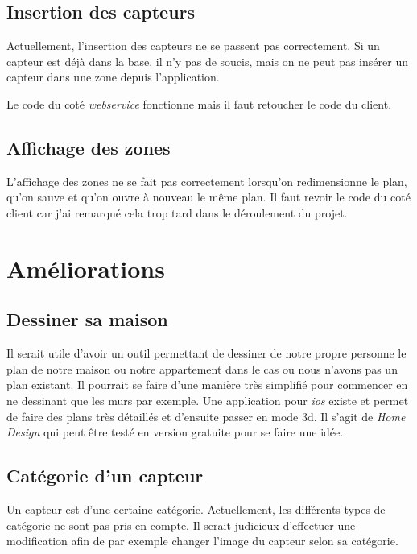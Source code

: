 \subsection{Insertion des capteurs} %
\label{sub:insertion_des_capteurs}
Actuellement, l'insertion des capteurs ne se passent pas correctement. Si un capteur est déjà dans la base, il n'y pas de soucis, mais on ne peut pas insérer un capteur dans une zone depuis l'application.

\medskip

Le code du coté \emph{\gls{webservice}} fonctionne mais il faut retoucher le code du client.

\subsection{Affichage des zones} %
\label{sub:affichage_des_zones}
L'affichage des zones ne se fait pas correctement lorsqu'on redimensionne le plan, qu'on sauve et qu'on ouvre à nouveau le même plan. Il faut revoir le code du coté client car j'ai remarqué cela trop tard dans le déroulement du projet.


\section{Améliorations} %
\label{sec:am_liorations}
\subsection{Dessiner sa maison} %
\label{sub:dessiner_sa_maison}
Il serait utile d'avoir un outil permettant de dessiner de notre propre personne le plan de notre maison ou notre appartement dans le cas ou nous n'avons pas un plan existant. Il pourrait se faire d'une manière très simplifié pour commencer en ne dessinant que les murs par exemple. Une application pour \emph{\gls{ios}} existe et permet de faire des plans très détaillés et d'ensuite passer en mode 3d. Il s'agit de \emph{Home Design} qui peut être testé en version gratuite pour se faire une idée.
\subsection{Catégorie d'un capteur} %
\label{sub:cat_gorie_d_un_capteur}
Un capteur est d'une certaine catégorie. Actuellement, les différents types de catégorie ne sont pas pris en compte. Il serait judicieux d'effectuer une modification afin de par exemple changer l'image du capteur selon sa catégorie.

